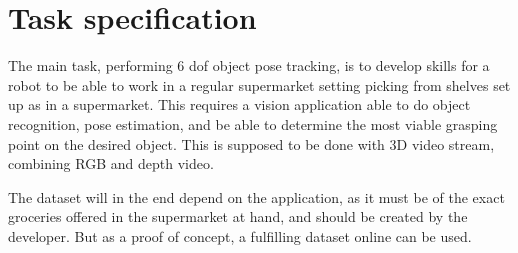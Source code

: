 \section{Task specification}
The main task, performing 6 \gls{dof} object pose tracking, is to develop skills for a robot to be able to work in a regular supermarket setting picking from shelves set up as in a supermarket. This requires a vision application able to do object recognition, pose estimation, and be able to determine the most viable grasping point on the desired object. 
This is supposed to be done with 3D video stream, combining RGB and depth video. 

The dataset will in the end depend on the application, as it must be of the exact groceries offered in the supermarket at hand, and should be created by the developer. But as a proof of concept, a fulfilling dataset online can be used.
